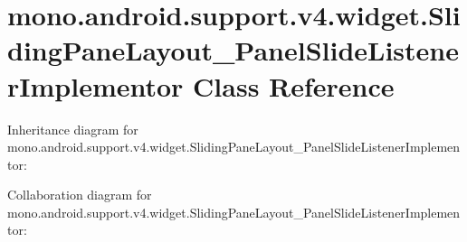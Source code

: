 \hypertarget{classmono_1_1android_1_1support_1_1v4_1_1widget_1_1_sliding_pane_layout___panel_slide_listener_implementor}{}\section{mono.\+android.\+support.\+v4.\+widget.\+Sliding\+Pane\+Layout\+\_\+\+Panel\+Slide\+Listener\+Implementor Class Reference}
\label{classmono_1_1android_1_1support_1_1v4_1_1widget_1_1_sliding_pane_layout___panel_slide_listener_implementor}


Inheritance diagram for mono.\+android.\+support.\+v4.\+widget.\+Sliding\+Pane\+Layout\+\_\+\+Panel\+Slide\+Listener\+Implementor\+:


Collaboration diagram for mono.\+android.\+support.\+v4.\+widget.\+Sliding\+Pane\+Layout\+\_\+\+Panel\+Slide\+Listener\+Implementor\+:
